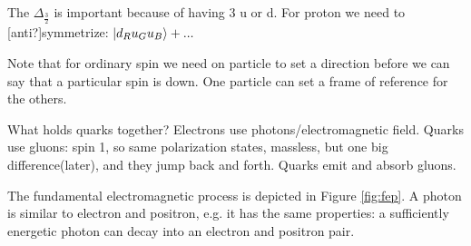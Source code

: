 \documentclass[]{article}
\begin{document}
The  $\Delta_\frac{3}{2}$ is important because of having 3 u or d. For proton we need to [anti?]symmetrize: $\ket{d_R u_G u_B}+...$

Note that for ordinary spin we need on particle to set a direction before we can say that a particular spin is down. One particle can set a frame of reference for the others.

What holds quarks together? Electrons use photons/electromagnetic field. Quarks use gluons: spin 1, so same polarization states, massless, but one big difference(later), and they jump back and forth. Quarks emit and absorb gluons.

The fundamental electromagnetic process is depicted in Figure \ref{fig:fep}. A photon is similar to electron and positron, e.g. it has the same properties: a sufficiently energetic photon can decay into an electron and positron pair.
\end{document}
